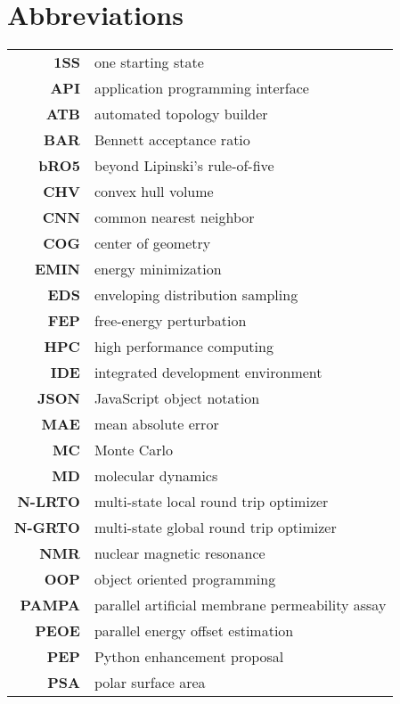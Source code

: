 \chapter{Abbreviations}
\begin{center}
\begin{longtable}{ >{\bfseries}r l}

 1SS & one starting state \\
 API & application programming interface\\
 ATB & automated topology builder \\

 BAR & Bennett acceptance ratio \\
 bRO5 & beyond Lipinski's rule-of-five \\

 CHV & convex hull volume\\
 CNN & common nearest neighbor\\
 COG & center of geometry\\
 
 EMIN & energy minimization\\
 EDS & enveloping distribution sampling \\
 FEP & free-energy perturbation \\

 HPC & high performance computing \\
 IDE & integrated development environment\\

 JSON & JavaScript object notation\\

 MAE & mean absolute error\\
 MC  & Monte Carlo \\
 MD  & molecular dynamics\\ 
 N-LRTO & multi-state local round trip optimizer \\
 N-GRTO & multi-state global round trip optimizer \\
 NMR & nuclear magnetic resonance\\
 
 OOP & object oriented programming\\

 PAMPA & parallel artificial membrane permeability assay\\
 PEOE & parallel energy offset estimation\\
 PEP & Python enhancement proposal\\
 PSA & polar surface area\\


\end{longtable}
\end{center}
